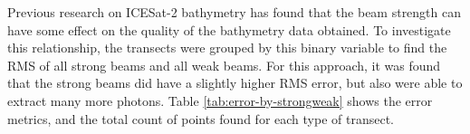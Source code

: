 Previous research on ICESat-2 bathymetry has found that the beam strength can have some effect on the quality of the bathymetry data obtained. To investigate this relationship, the transects were grouped by this binary variable to find the RMS of all strong beams and all weak beams. For this approach, it was found that the strong beams did have a slightly higher RMS error, but also were able to extract many more photons. Table \ref{tab:error-by-strongweak} shows the error metrics, and the total count of points found for each type of transect. 




